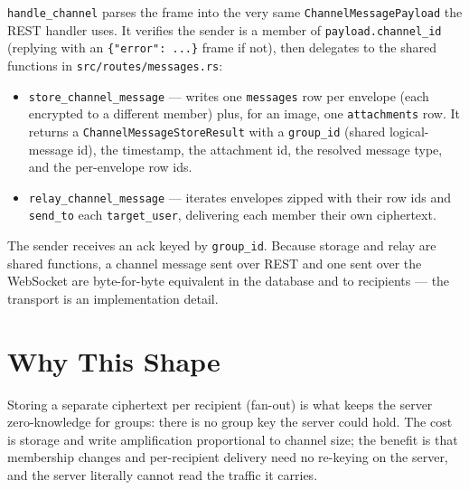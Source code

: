 \verb|handle_channel| parses the frame into the very same
\verb|ChannelMessagePayload| the REST handler uses. It verifies the sender is a
member of \verb|payload.channel_id| (replying with an \verb|{"error": ...}| frame
if not), then delegates to the shared functions in
\verb|src/routes/messages.rs|:

\begin{itemize}
  \item \verb|store_channel_message| --- writes one \verb|messages| row per
        envelope (each encrypted to a different member) plus, for an image, one
        \verb|attachments| row. It returns a \verb|ChannelMessageStoreResult| with
        a \verb|group_id| (shared logical-message id), the timestamp, the
        attachment id, the resolved message type, and the per-envelope row ids.
  \item \verb|relay_channel_message| --- iterates envelopes zipped with their row
        ids and \verb|send_to| each \verb|target_user|, delivering each member
        their own ciphertext.
\end{itemize}

The sender receives an ack keyed by \verb|group_id|. Because storage and relay
are shared functions, a channel message sent over REST and one sent over the
WebSocket are byte-for-byte equivalent in the database and to recipients --- the
transport is an implementation detail.

\section{Why This Shape}

Storing a separate ciphertext per recipient (fan-out) is what keeps the server
zero-knowledge for groups: there is no group key the server could hold. The cost
is storage and write amplification proportional to channel size; the benefit is
that membership changes and per-recipient delivery need no re-keying on the
server, and the server literally cannot read the traffic it carries.
